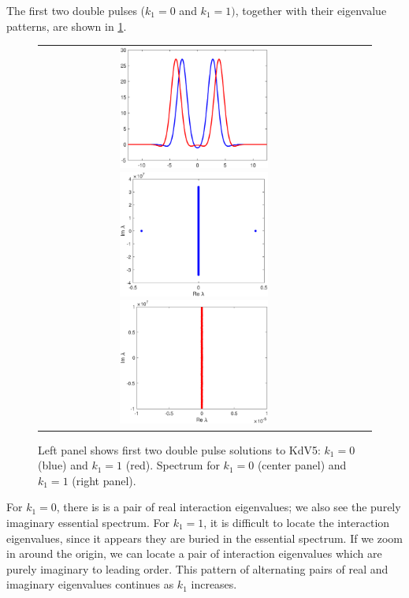 \documentclass[12pt,reqno]{amsart}
\theoremstyle{definition}
\theoremstyle{remark}
\begin{document}
The first two double pulses ($k_1 = 0$ and $k_1 = 1)$, together with their eigenvalue patterns, are shown in \cref{fig:KdV5dp}.
\begin{figure}[ht]
\centering
\begin{tabular}{ccc}
\includegraphics[width=5cm]{double12.eps}
\includegraphics[width=5cm]{dpeig1.eps}
\includegraphics[width=5cm]{dpeig2.eps}
\end{tabular}
\caption{Left panel shows first two double pulse solutions to KdV5: $k_1 = 0$ (blue) and $k_1 = 1$ (red). Spectrum for $k_1 = 0$ (center panel) and $k_1 = 1$ (right panel).
 } 
\label{fig:KdV5dp}
\end{figure}
For $k_1 = 0$, there is is a pair of real interaction eigenvalues; we also see the purely imaginary essential spectrum. For $k_1 = 1$, it is difficult to locate the interaction eigenvalues, since it appears they are buried in the essential spectrum. If we zoom in around the origin, we can locate a pair of interaction eigenvalues which are purely imaginary to leading order. This pattern of alternating pairs of real and imaginary eigenvalues continues as $k_1$ increases. 
\end{document}
